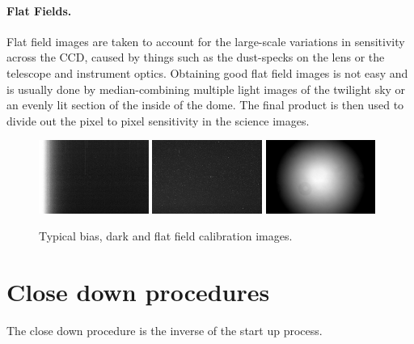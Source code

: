 \documentclass[12pt,twoside,a4paper]{report}
\begin{document}
\paragraph{Flat Fields.}
  Flat field images are taken to account for the large-scale variations in sensitivity across the CCD, caused by things such as the dust-specks on the lens or the telescope and instrument optics. Obtaining good flat field images is not easy and is usually done by median-combining multiple light images of the twilight sky or an evenly lit section of the inside of the dome. The final product is then used to divide out the pixel to pixel sensitivity in the science images.\\

\begin{figure}[ht]
  \centering
    \includegraphics[width=0.32\textwidth]{documentation_images/calibration_bias.jpg}
    \includegraphics[width=0.32\textwidth]{documentation_images/calibration_dark.jpg}
    \includegraphics[width=0.32\textwidth]{documentation_images/calibration_flat.jpg}
    \caption{\label{fig:cal}Typical bias, dark and flat field calibration images.}
\end{figure}

\clearpage

\section{Close down procedures}

The close down procedure is the inverse of the start up process.\\
\end{document}
